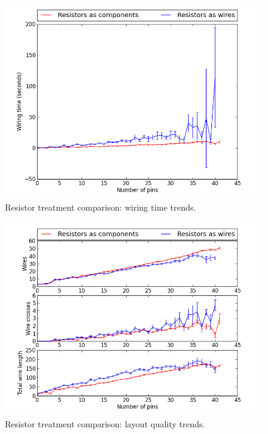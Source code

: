 \begin{figure}[H]
\begin{center}
\includegraphics[width=\textwidth]{Images/resistor_time_trend_comparison.png}
\caption{Resistor treatment comparison: wiring time trends.}
\label{fig:resistor_time_trend}
\end{center}
\end{figure}

\begin{figure}
\begin{center}
\includegraphics[width=\textwidth]{Images/resistor_quality_trend_comparison.png}
\caption{Resistor treatment comparison: layout quality trends.}
\label{fig:resistor_quality_trend}
\end{center}
\end{figure}

